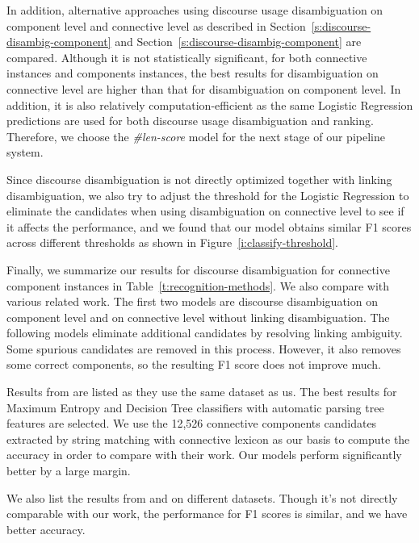 In addition, alternative approaches using discourse usage
disambiguation on component level and connective
level as described in Section~\ref{s:discourse-disambig-component} and
Section~\ref{s:discourse-disambig-component} are compared.
Although it is not statistically significant, for both connective
instances and components instances, the best results for disambiguation on connective
level are higher than that for disambiguation on component level.
In addition, it is also relatively computation-efficient as the same Logistic
Regression predictions are used for both discourse usage disambiguation and ranking.
Therefore, we choose the \textit{\#len-score} model for the next stage of our
pipeline system.



Since discourse disambiguation is not directly optimized together with linking
disambiguation, we also try to adjust the threshold for the Logistic Regression
to eliminate the candidates when using disambiguation on connective level to see if
it affects the performance, and we found that our model
obtains similar F1 scores across different thresholds as
shown in Figure~\ref{i:classify-threshold}.



Finally, we summarize our results for discourse disambiguation for
connective component instances in Table~\ref{t:recognition-methods}. We also
compare with various related work. The first two models are discourse disambiguation
on component level and on connective level without linking disambiguation. The following
models eliminate additional candidates by resolving linking ambiguity.
Some spurious candidates are removed in this process. However, it also removes some
correct components, so the resulting F1 score does not improve much.



Results from \cite{li2015automatic} are listed as they use the
same dataset as us. The best results for Maximum Entropy and Decision Tree classifiers with
automatic parsing tree features are selected. We use the 12,526 connective components candidates
extracted by string matching with connective lexicon as our basis to compute the accuracy in order
to compare with their work. Our models perform significantly better by a large margin.

We also list the results from \cite{zhou2012cross} and \cite{li2014cross} on different
datasets. Though it's not directly comparable with our work, the performance for F1 scores is similar,
and we have better accuracy.


